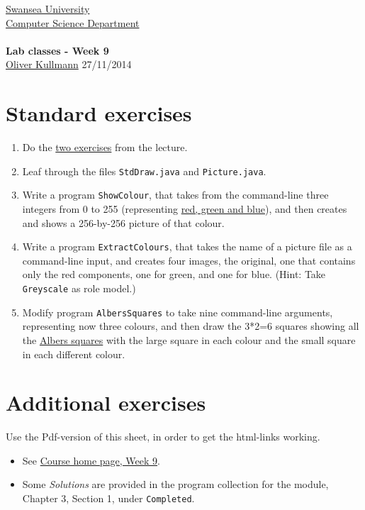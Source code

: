 \documentclass[11pt]{article}
\newcommand{\Java}{\lstset{language=Java,keywordstyle=\bfseries,breaklines,breakindent=30pt}}
\begin{document}
\begin{center}
  \href{http://www.swan.ac.uk/}{Swansea University}\\
  \href{http://www.swan.ac.uk/compsci/}{Computer Science Department}\\[1ex]
  \href{\chp}{\module}\\[1ex]
  \textbf{Lab classes - Week 9}\\
  \href{http://cs.swan.ac.uk/~csoliver}{Oliver Kullmann} 27/11/2014
\end{center}


\section{Standard exercises}
\label{sec:stdex}

\Java

\begin{enumerate}
\item Do the \href{\chp#PractiseLectureWeek09}{two exercises} from the lecture.
\item Leaf through the files \texttt{StdDraw.java} and \texttt{Picture.java}.
\item Write a program \texttt{ShowColour}, that takes from the command-line three integers from 0 to 255 (representing \href{http://en.wikipedia.org/wiki/RGB_color_model}{red, green and blue}), and then creates and shows a 256-by-256 picture of that colour.
\item Write a program \texttt{ExtractColours}, that takes the name of a picture file as a command-line input, and creates four images, the original, one that contains only the red components, one for green, and one for blue. (Hint: Take \texttt{Greyscale} as role model.)
\item Modify program \texttt{AlbersSquares} to take nine command-line arguments, representing now three colours, and then draw the 3*2=6 squares showing all the \href{http://en.wikipedia.org/wiki/Josef_Albers}{Albers squares} with the large square in each colour and the small square in each different colour.
\end{enumerate}


\section{Additional exercises}
\label{sec:addex}

Use the Pdf-version of this sheet, in order to get the html-links working.
\begin{itemize}
\item See \href{\chp#ExercisesWeek09}{Course home page, Week 9}.
\item Some \emph{Solutions} are provided in the program collection for the module, Chapter 3, Section 1, under \texttt{Completed}.
\end{itemize}
\end{document}
